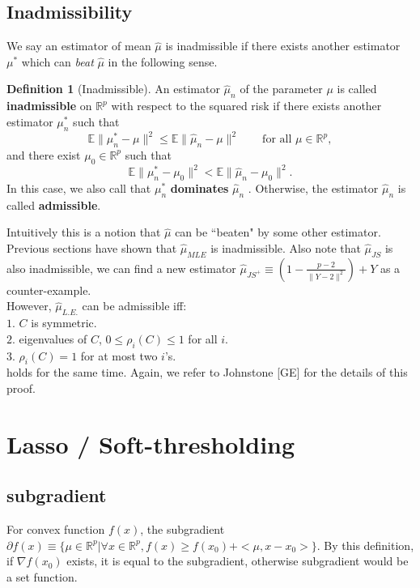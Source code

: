 \documentclass[twoside]{article}
\theoremstyle{definition}
\theoremstyle{definition}
\newtheorem*{defn}{Definition}
\theoremstyle{remark}
\def\R{{\mathbb R}}
\def\E{{\mathbb E}}
\begin{document}
\subsection{Inadmissibility}
We say an estimator of mean $\hat\mu$ is inadmissible if there exists another estimator $\mu^*$ which can \emph{beat} $\hat{\mu}$ in the following sense.
\begin{defn}[Inadmissible]
  An estimator $\hat{\mu}_{n}$ of the parameter $\mu$ is called \textbf{inadmissible} on $\R^p$ with respect to the squared risk if there exists another estimator $\mu^*_n$ such that
  $$\E\|\mu_{n}^*-\mu\|^2 \leq \E\|\hat{\mu}_n-\mu\|^2\qquad \textrm{for all }\mu\in\R^p,$$
  and there exist $\mu_0\in\R^p$ such that
  $$\E\|\mu_{n}^*-\mu_0\|^2<\E\|\hat{\mu}_n-\mu_0\|^2.$$
  In this case, we also call that $\mu_n^*$ \textbf{dominates} $\hat{\mu}_{n}$ .  
  Otherwise, the estimator $\hat{\mu}_{n}$ is called \textbf{admissible}.
\end{defn}
Intuitively this is a notion that $\hat\mu$ can be ``beaten" by some other estimator. Previous sections have shown that $\hat\mu_{MLE}$ is inadmissible. Also note that $\hat\mu_{JS}$ is also inadmissible, we can find a new estimator $\hat\mu_{JS^+} \equiv (1-\frac{p-2}{\| Y-2 \|^2}) + Y$ as a counter-example.\\ 
However, $\hat\mu_{L.E.}$ can be admissible iff: \\
$1$. $C$ is symmetric.\\
$2$. eigenvalues of $C$, $0 \le \rho_i(C) \le 1$ for all $i$.\\
$3$. $\rho_i(C) = 1$ for at most two $i$'s.\\
holds for the same time. Again, we refer to Johnstone [GE] for the details of this proof.
\section{Lasso / Soft-thresholding}
\subsection{subgradient}
For convex function $f(x)$, the subgradient $\partial f(x) \equiv \{ \mu \in \mathbb{R}^p | \forall x \in \mathbb{R}^p, f(x) \ge f(x_0) + <\mu, x-x_0>\}$. By this definition, if $\nabla f(x_0)$ exists, it is equal to the subgradient, otherwise subgradient would be a set function.
\end{document}
